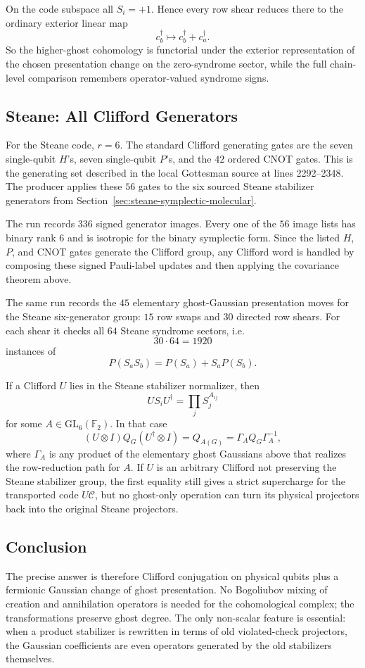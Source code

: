 On the code subspace all \(S_i=+1\).  Hence every row shear reduces there to
the ordinary exterior linear map
\[
  c_b^\dagger\mapsto c_b^\dagger+c_a^\dagger .
\]
So the higher-ghost cohomology is functorial under the exterior representation
of the chosen presentation change on the zero-syndrome sector, while the full
chain-level comparison remembers operator-valued syndrome signs.

\subsection{Steane: All Clifford Generators}

For the Steane code, \(r=6\).  The standard Clifford generating gates are the
seven single-qubit \(H\)'s, seven single-qubit \(P\)'s, and the \(42\) ordered
CNOT gates.  This is the generating set described in the local Gottesman source
at lines 2292--2348.  The producer
 applies
these \(56\) gates to the six sourced Steane stabilizer generators from
Section~\ref{sec:steane-symplectic-molecular}.

The run records \(336\) signed generator images.  Every one of the \(56\)
image lists has binary rank \(6\) and is isotropic for the binary symplectic
form.  Since the listed \(H\), \(P\), and CNOT gates generate the Clifford
group, any Clifford word is handled by composing these signed Pauli-label
updates and then applying the covariance theorem above.

The same run records the \(45\) elementary ghost-Gaussian presentation moves
for the Steane six-generator group: \(15\) row swaps and \(30\) directed row
shears.  For each shear it checks all \(64\) Steane syndrome sectors, i.e.
\[
  30\cdot64=1920
\]
instances of
\[
  P(S_aS_b)=P(S_a)+S_aP(S_b).
\]

If a Clifford \(U\) lies in the Steane stabilizer normalizer, then
\[
  US_iU^\dagger=\prod_jS_j^{A_{ij}}
\]
for some \(A\in\mathrm{GL}_6(\mathbb F_2)\).  In that case
\[
  (U\otimes I)Q_G(U^\dagger\otimes I)=Q_{A(G)}
  =
  \Gamma_AQ_G\Gamma_A^{-1},
\]
where \(\Gamma_A\) is any product of the elementary ghost Gaussians above that
realizes the row-reduction path for \(A\).  If \(U\) is an arbitrary Clifford
not preserving the Steane stabilizer group, the first equality still gives a
strict supercharge for the transported code \(U\mathcal C\), but no ghost-only
operation can turn its physical projectors back into the original Steane
projectors.

\subsection{Conclusion}

The precise answer is therefore Clifford conjugation on physical qubits plus a
fermionic Gaussian change of ghost presentation.  No Bogoliubov mixing of
creation and annihilation operators is needed for the cohomological complex;
the transformations preserve ghost degree.  The only non-scalar feature is
essential: when a product stabilizer is rewritten in terms of old violated-check
projectors, the Gaussian coefficients are even operators generated by the old
stabilizers themselves.
